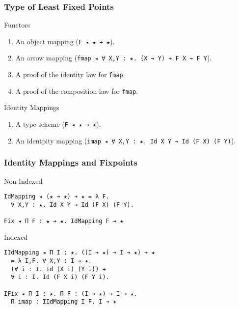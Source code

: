 \documentclass[mathserif,usenames,dvipsnames]{beamer}
\begin{document}
\begin{frame}[fragile]
\frametitle{Type of Least Fixed Points}
  
\begin{block}{Functors}
\begin{enumerate}
\item An object mapping (\verb;F ◂ ★ ➔ ★;).
\item An arrow mapping
  (\verb;fmap ◂ ∀ X,Y : ★. (X ➔ Y) ➔ F X ➔ F Y;).
\item A proof of the identity law for \verb;fmap;.
\item A proof of the composition law for \verb;fmap;.
\end{enumerate}
\end{block}

\begin{block}{Identity Mappings}
\begin{enumerate}
\item A type scheme (\verb;F ◂ ★ ➔ ★;).
\item An identpity mapping
  (\verb;imap ◂ ∀ X,Y : ★. Id X Y ➔ Id (F X) (F Y);).
\end{enumerate}
\end{block}

\end{frame}

\begin{frame}[fragile]
\frametitle{Identity Mappings and Fixpoints}

\begin{block}{Non-Indexed}
\begin{verbatim}
IdMapping ◂ (★ ➔ ★) ➔ ★ = λ F. 
  ∀ X,Y : ★. Id X Y ➔ Id (F X) (F Y).

Fix ◂ Π F : ★ ➔ ★. IdMapping F ➔ ★
\end{verbatim}
\end{block}

\begin{block}{Indexed}
\begin{verbatim}
IIdMapping ◂ Π I : ★. ((I ➔ ★) ➔ I ➔ ★) ➔ ★ 
  = λ I,F. ∀ X,Y : I ➔ ★. 
  (∀ i : I. Id (X i) (Y i)) ➔ 
  ∀ i : I. Id (F X i) (F Y i).

IFix ◂ Π I : ★. Π F : (I ➔ ★) ➔ I ➔ ★. 
  Π imap : IIdMapping I F. I ➔ ★
\end{verbatim}
\end{block}

\end{frame}
\end{document}
